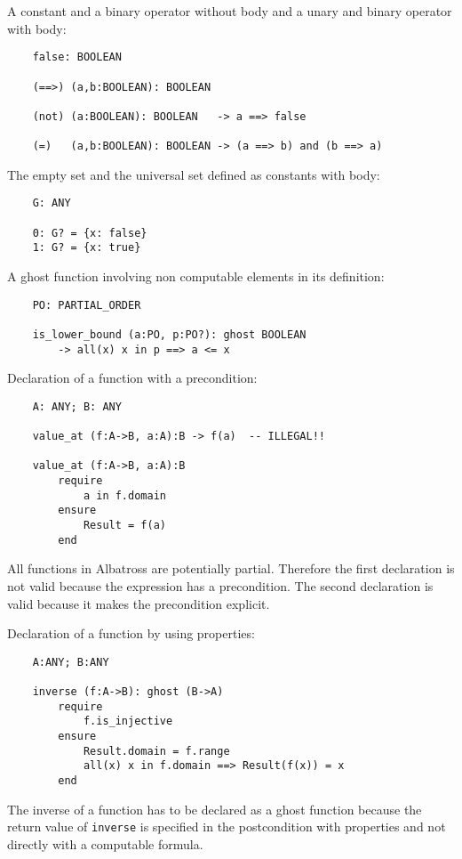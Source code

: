 \noindent A constant and a binary operator without body and a unary and binary operator
with body:
\begin{lstlisting}
    false: BOOLEAN

    (==>) (a,b:BOOLEAN): BOOLEAN

    (not) (a:BOOLEAN): BOOLEAN   -> a ==> false

    (=)   (a,b:BOOLEAN): BOOLEAN -> (a ==> b) and (b ==> a)
\end{lstlisting}

\noindent The empty set and the universal set defined as constants with body:
\begin{lstlisting}
    G: ANY

    0: G? = {x: false}
    1: G? = {x: true}
\end{lstlisting}


\noindent A ghost function involving non computable elements in its definition:
\begin{lstlisting}
    PO: PARTIAL_ORDER

    is_lower_bound (a:PO, p:PO?): ghost BOOLEAN
        -> all(x) x in p ==> a <= x
\end{lstlisting}


\noindent Declaration of a function with a precondition:
\begin{lstlisting}
    A: ANY; B: ANY

    value_at (f:A->B, a:A):B -> f(a)  -- ILLEGAL!!

    value_at (f:A->B, a:A):B
        require
            a in f.domain
        ensure
            Result = f(a)
        end
\end{lstlisting}
%
All functions in Albatross are potentially partial. Therefore the first
declaration is not valid because the expression has a precondition. The second
declaration is valid because it makes the precondition explicit.

\noindent Declaration of a function by using properties:
\begin{lstlisting}
    A:ANY; B:ANY

    inverse (f:A->B): ghost (B->A)
        require
            f.is_injective
        ensure
            Result.domain = f.range
            all(x) x in f.domain ==> Result(f(x)) = x
        end
\end{lstlisting}
%
The inverse of a function has to be declared as a ghost function because the
return value of \lstinline!inverse! is specified in the postcondition with
properties and not directly with a computable formula.

